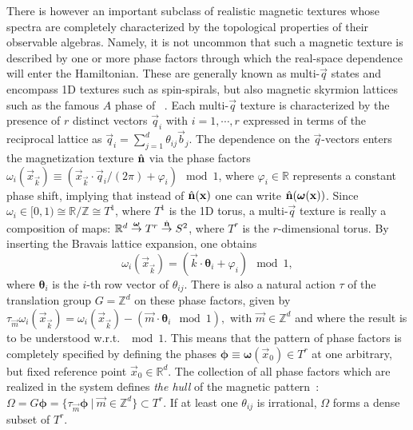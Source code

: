 \documentclass[
    10pt,
    aps,
    prl,
    twocolumn,
    floatfix,
    superscriptaddress
]{revtex4-2}
\begin{document}
There is however an important subclass of realistic magnetic textures whose spectra are completely characterized by the topological properties of their observable algebras.
Namely, it is not uncommon that such a magnetic texture is described by one or more phase factors through which the real-space dependence will enter the Hamiltonian. 
These are generally known as multi-$\vec{q}$ states and encompass 1D textures such as spin-spirals, but also magnetic skyrmion lattices such as the famous $A$ phase of ~\cite{Neubauer2009}.
Each multi-$\vec{q}$ texture is characterized by
the presence of $r$ distinct vectors $\vec{q}_i$ with $i=1,\cdots,r$ expressed in terms of the reciprocal lattice as $\vec{q}_i = \sum_{j=1}^d \theta_{ij} \vec{b}_j$.
The dependence on the $\vec{q}$-vectors enters the magnetization texture $\hat{\mathbf{n}}$ via the
phase factors 
$
    \omega_i (\vec{x}_\vec{k}) \equiv  (\vec{x}_\vec{k}  \cdot \vec{q}_i/ (2\pi) + \varphi_i) \mod 1 
$, where $\varphi_i \in \mathbb{R}$ represents a constant phase shift, implying that instead of $\hat{\mathbf{n}}(\mathbf{x})$  one can write $\hat{\mathbf{n}}( \boldsymbol{\omega} (\mathbf{x}) )$.
Since $\omega_i \in [0,1) \cong \mathbb{R}/ \mathbb{Z} \cong T^1$, where $T^1$ is the 1D torus, a multi-$\vec{q}$ texture is really a composition of maps: $\mathbb{R}^d \overset{\boldsymbol{\omega}}{\rightarrow} T^r
     \overset{\hat{\mathbf{n}}}{\rightarrow} S^2 $, where $T^r$ is the $r$-dimensional torus.
By inserting the Bravais lattice expansion, one obtains
\begin{equation}
    \omega_i (\vec{x}_\vec{k}) = \left(
      \vec{k} \cdot \boldsymbol{\theta}_i
     + \varphi_i
    \right) \mod 1,
\end{equation}
where $\boldsymbol{\theta}_i$ is the $i$-th row vector of $\theta_{ij}$.
There is also a natural action $\tau$ of the translation group $G=\mathbb{Z}^d$ on these phase factors, given by
$
    \tau_{\vec{m}}\omega_i (\vec{x}_\vec{k}) =\omega_i (\vec{x}_\vec{k} ) - ( \vec{m} \cdot \boldsymbol{\theta}_i \mod 1) ,
$
with $\vec{m}\in \mathbb{Z}^d$ and where the result is to be understood w.r.t. $\mod 1$.
This means that the pattern of phase factors is completely specified by defining the phases  $\boldsymbol{\phi} \equiv \boldsymbol{\omega}(\vec{x}_0) \in T^r$  at one arbitrary, but fixed reference point $\vec{x}_0 \in \mathbb{R}^d$.
The collection of all phase factors which are realized in the system defines {\it the hull} of the magnetic pattern~\cite{Bellissard2000}:
$
    \Omega = G\boldsymbol{\phi}= \lbrace \tau_{\vec{m}}\boldsymbol{\phi} ~|~ \vec{m} \in \mathbb{Z}^d \rbrace  \subset T^r 
$.
If at least one $\theta_{ij}$ is irrational, $\Omega$ forms a dense subset of $T^r$.
\end{document}
